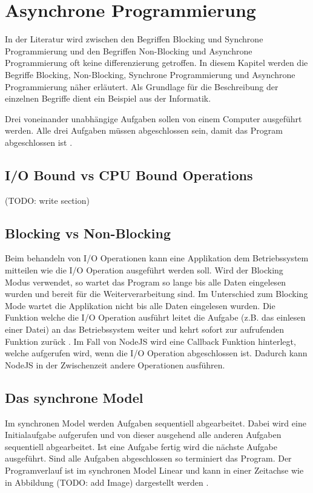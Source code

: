 \section{Asynchrone Programmierung}

In der Literatur wird zwischen den Begriffen Blocking und Synchrone Programmierung und den Begriffen Non-Blocking und Asynchrone Programmierung oft keine differenzierung getroffen. In diesem Kapitel werden die Begriffe Blocking, Non-Blocking, Synchrone Programmierung und Asynchrone Programmierung näher erläutert. Als Grundlage für die Beschreibung der einzelnen Begriffe dient ein Beispiel aus der Informatik. 

Drei voneinander unabhängige Aufgaben sollen von einem Computer ausgeführt werden. Alle drei Aufgaben müssen abgeschlossen sein, damit das Program abgeschlossen ist \cite[]{Pet2015}. 

\subsection{I/O Bound vs CPU Bound Operations}
(TODO: write section)


\subsection{Blocking vs Non-Blocking}

Beim behandeln von I/O Operationen kann eine Applikation dem Betriebssystem mitteilen wie die I/O Operation ausgeführt werden soll. Wird der Blocking Modus verwendet, so wartet das Program so lange bis alle Daten eingelesen wurden und bereit für die Weiterverarbeitung sind. Im Unterschied zum Blocking Mode wartet die Applikation nicht bis alle Daten eingelesen wurden. Die Funktion welche die I/O Operation ausführt leitet die Aufgabe (z.B. das einlesen einer Datei) an das Betriebssystem weiter und kehrt sofort zur aufrufenden Funktion zurück \cite[p. 47]{Erb2012}. Im Fall von NodeJS wird eine Callback Funktion hinterlegt, welche aufgerufen wird, wenn die I/O Operation abgeschlossen ist. Dadurch kann NodeJS in der Zwischenzeit andere Operationen ausführen. 

\subsection{Das synchrone Model}

Im synchronen Model werden Aufgaben sequentiell abgearbeitet. Dabei wird eine Initialaufgabe aufgerufen und von dieser ausgehend alle anderen Aufgaben sequentiell abgearbeitet. Ist eine Aufgabe fertig wird die nächste Aufgabe ausgeführt. Sind alle Aufgaben abgeschlossen so terminiert das Program. Der Programverlauf ist im synchronen Model Linear und kann in einer Zeitachse wie in Abbildung (TODO: add Image) dargestellt werden \cite[]{Pet2015}.


